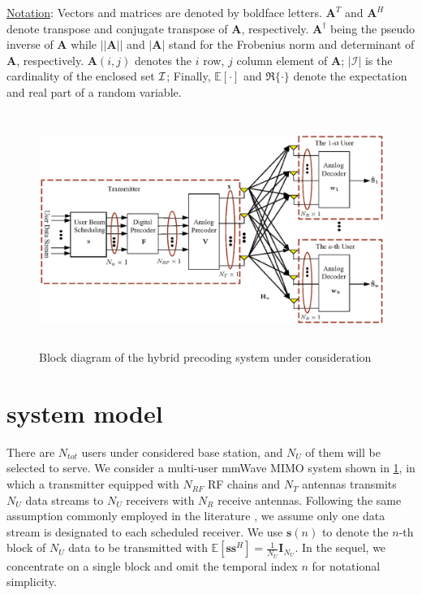 \documentclass[conference]{IEEEtran}
\begin{document}
\underline{Notation}: Vectors and matrices are denoted by boldface letters. ${\bm A}^T$ and ${\bm A}^H$ denote transpose and conjugate transpose of ${\bm A}$, respectively. $\bm{A}^\dagger$ being the pseudo inverse of $\bm{A}$ while $||\bm{A}|| $ and $|\bm{A}|$ stand for the Frobenius norm and determinant of ${\bm A}$, respectively. $\bm{A}(i,j)$ denotes the $i$ row, $j$ column element of ${\bm A}$; $|\mathcal{I}|$ is the cardinality of the enclosed set ${\cal I}$; Finally, $\mathbb{E}[\cdot] $ and $\Re\{\cdot\}$ denote the expectation and real part of a random variable.

\begin{figure}[htpb]
	\centering
	\begin{minipage}[t]{0.7\linewidth}
		\includegraphics[width=5.6in,height=3in]{PPTFigure/BlockDiagonal.eps}
		\caption{Block diagram of the hybrid precoding system under consideration}\label{fig:BlockDiagram}
		\parbox{6.5cm}{\small \hspace{1.5cm} }
	\end{minipage}
\end{figure}

\section{system model}
There are $N_{tot}$ users under considered base station, and $N_U$ of them will be selected to serve. We consider a multi-user mmWave MIMO system shown in \figurename{ \ref{fig:BlockDiagram}}, in which a transmitter equipped with $N_{RF}$ RF chains and $N_T$ antennas transmits $N_U$ data streams to $N_U$ receivers with $N_R$ receive antennas. Following the same assumption commonly employed in the literature \cite{alkhateeb2015limited}, we assume only one data stream is designated to each scheduled receiver. We use ${\bm s}(n)$ to denote the $n$-th block of $N_U$ data to be transmitted with $\mathbb{E}\left[\bm{ss}^H\right]=\frac{1}{N_U}\bm{I}_{N_U}$. In the sequel, we concentrate on a single block and omit the temporal index $n$ for notational simplicity.
\end{document}
